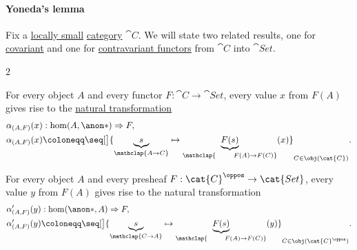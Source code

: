 \paragraph{Yoneda's lemma}

\begin{lemma}\label{thm:yonedas_lemma}
  Fix a \hyperref[def:small_category]{locally small} \hyperref[def:category]{category} \( \cat{C} \). We will state two related results, one for \hyperref[def:functor]{covariant} and one for \hyperref[def:contravariant_functor]{contravariant functors} from \( \cat{C} \) into \( \cat{Set} \).

  \begin{thmenum}
    \begin{paracol}{2}
      \begin{leftcolumn}
        \ParacolAlignmentHack
        For every object \( A \) and every functor \( {F: \cat{C} \to \cat{Set}} \), every value \( x \) from \( F(A) \) gives rise to the \hyperref[def:natural_transformation]{natural transformation}
        \begin{equation*}
          \begin{aligned}
            &\alpha_{(A, F)}(x): \hom(A, \anon*) \Rightarrow F, \\
            &\alpha_{(A, F)}(x) \coloneqq \seq[\big]{ \underbrace{s}_{\mathclap{A \to C}} \mapsto \underbrace{F(s)}_{\mathclap{\qquad F(A) \to F(C)}}(x) }_{C \in \obj(\cat{C})}.
          \end{aligned}
        \end{equation*}
      \end{leftcolumn}

      \begin{rightcolumn}
        \ParacolAlignmentHack
        For every object \( A \) and every presheaf \( {F: \cat{C}^{\oppos} \to \cat{Set}} \), every value \( y \) from \( F(A) \) gives rise to the natural transformation
        \begin{equation*}
          \begin{aligned}
            &\alpha'_{(A, F)}(y): \hom(\anon*, A) \Rightarrow F, \\
            &\alpha'_{(A, F)}(y) \coloneqq \seq[\big]{ \underbrace{s}_{\mathclap{C \to A}} \mapsto \underbrace{F(s)}_{\mathclap{\qquad F(A) \to F(C)}}(y) }_{C \in \obj(\cat{C}^\oppos)}.
          \end{aligned}
        \end{equation*}
      \end{rightcolumn}
    \end{paracol}


\end{thmenum}
\end{lemma}
